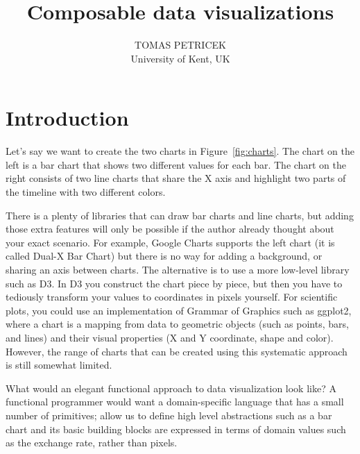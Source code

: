 \documentclass{jfp}
\title{Composable data visualizations}
\author[Tomas Petricek]{TOMAS PETRICEK\\
       University of Kent, UK\\
       \email{t.petricek@kent.ac.uk}}
\begin{document}
\maketitle[f]





\section{Introduction}
Let's say we want to create the two charts in Figure~\ref{fig:charts}. The chart on the left is
a bar chart that shows two different values for each bar. The chart on the right consists of two
line charts that share the X axis and highlight two parts of the timeline with two different colors.

There is a plenty of libraries that can draw bar charts and line charts, but adding those extra
features will only be possible if the author already thought about your exact scenario. For
example, Google Charts supports the left chart (it is called Dual-X Bar Chart) but there is no
way for adding a background, or sharing an axis between charts. The alternative is to use a more
low-level library such as D3. In D3 you construct the chart piece by piece, but then you have to
tediously transform your values to coordinates in pixels yourself. For scientific plots,
you could use an implementation of Grammar of Graphics such as ggplot2, where a chart is
a mapping from data to geometric objects (such as points, bars, and lines) and their visual
properties (X and Y coordinate, shape and color). However, the range of charts that can be
created using this systematic approach is still somewhat limited.

What would an elegant functional approach to data visualization look like? A functional programmer
would want a domain-specific language that has a small number of primitives; allow us to define
high level abstractions such as a bar chart and its basic building blocks are expressed in terms
of domain values such as the exchange rate, rather than pixels.
\end{document}
